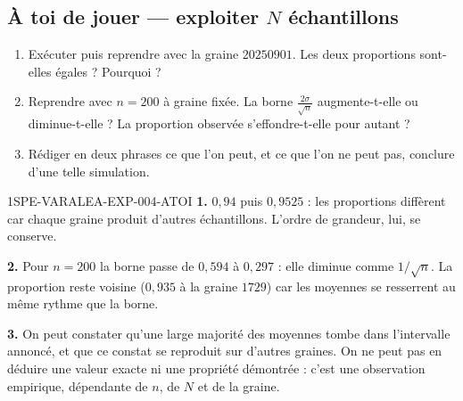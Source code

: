 \subsection*{À toi de jouer — exploiter $N$ échantillons}

\begin{enumerate}
  \item Exécuter  puis reprendre
        avec la graine $20250901$. Les deux proportions sont-elles égales ?
        Pourquoi ?
  \item Reprendre avec $n=200$ à graine fixée. La borne
        $\frac{2\sigma}{\sqrt{n}}$ augmente-t-elle ou diminue-t-elle ?
        La proportion observée s'effondre-t-elle pour autant ?
  \item Rédiger en deux phrases ce que l'on peut, et ce que l'on ne peut pas,
        conclure d'une telle simulation.
\end{enumerate}

\ifnxVersionProfesseur
\begin{corrige}{1SPE-VARALEA-EXP-004-ATOI}
\textbf{1.} $0{,}94$ puis $0{,}9525$ : les proportions diffèrent car chaque
graine produit d'autres échantillons. L'ordre de grandeur, lui, se conserve.

\textbf{2.} Pour $n=200$ la borne passe de $0{,}594$ à $0{,}297$ : elle
diminue comme $1/\sqrt{n}$. La proportion reste voisine ($0{,}935$ à la graine
$1729$) car les moyennes se resserrent au même rythme que la borne.

\textbf{3.} On peut constater qu'une large majorité des moyennes tombe dans
l'intervalle annoncé, et que ce constat se reproduit sur d'autres graines. On
ne peut pas en déduire une valeur exacte ni une propriété démontrée : c'est
une observation empirique, dépendante de $n$, de $N$ et de la graine.
\end{corrige}
\fi
